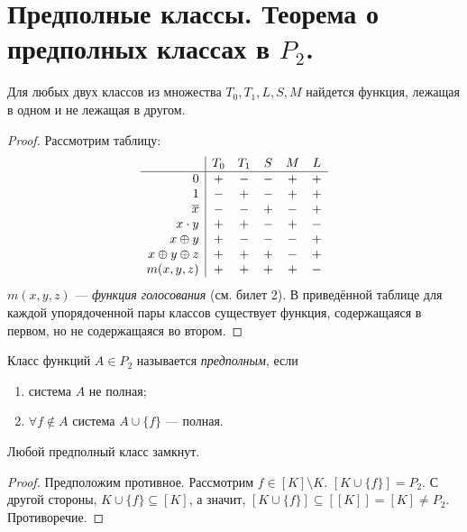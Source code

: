 \section{Предполные классы. Теорема о предполных классах в $P_2$.}

\begin{lemma}
    Для любых двух классов из множества ${T_0,T_1, L, S, M}$ найдется функция, лежащая в одном и не лежащая в другом.
\end{lemma}

\begin{proof}
    Рассмотрим таблицу:
    \[
        \begin{array}{r | c c c c c}
            & T_0 & T_1 & S & M & L\\
            \hline
            0 & + & - & - & + & +\\
            1 & - & + & - & + & +\\
            \overline{x} & - & - & + & - & +\\
            x \cdot y & + & + & - & + & -\\
            x \oplus y & + & - & - & - & +\\
            x \oplus y \oplus z & + & + & + & - & +\\
            m(x, y, z) & + & + & + & + & -\\
        \end{array}
    \]
    $m(x, y, z)$ --- \textit{функция голосования} (см. билет 2). В приведённой таблице для каждой упорядоченной пары классов существует функция, содержащаяся в первом, но не содержащаяся во втором.
\end{proof}

\begin{definition}
    Класс функций $A \in P_2$ называется \textit{предполным}, если
    \begin{enumerate}[nolistsep]
        \item система $A$ не полная;
        \item $\forall f \notin A$ система $A \cup \{f\}$ --- полная.
    \end{enumerate}
\end{definition}

\begin{remark}
    Любой предполный класс замкнут.
\end{remark}

\begin{proof}
    Предположим противное. Рассмотрим $f \in [K] \setminus K$. $[K \cup \{f\}] = P_2$. С другой стороны, $K \cup \{f\} \subseteq [K]$, а значит, $[K \cup \{f\}] \subseteq [[K]] = [K] \ne P_2$. Противоречие.
\end{proof}

